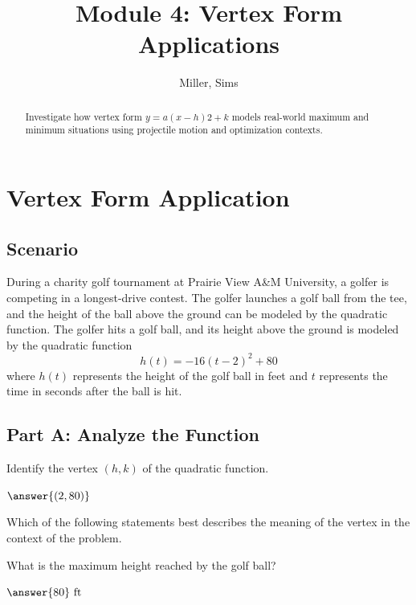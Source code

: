 \documentclass{ximera}
\title{Module 4: Vertex Form Applications}
\author{Miller, Sims}
\begin{document}
\begin{abstract}
    Investigate how vertex form $y=a(x-h)2 +k$ models real-world maximum and minimum situations using projectile motion and optimization contexts. 
\end{abstract}

\section{Vertex Form Application}

\subsection*{Scenario}
During a charity golf tournament at Prairie View A\&M University, a golfer is competing in a longest-drive contest. The golfer launches a golf ball from the tee, and the height of the ball above the ground can be modeled by the quadratic function. The golfer hits a golf ball, and its height above the ground is modeled by the quadratic function $$h(t)=-16(t-2)^2+80$$ where $h(t)$ represents the height of the golf ball in feet and $t$ represents the time in seconds after the ball is hit.


\subsection*{Part A: Analyze the Function}
\begin{problem}
Identify the vertex $(h,k)$ of the quadratic function. 

$\answer{(2,80)}$
\end{problem}

\begin{problem}
Which of the following statements best describes the meaning of the vertex in the context of the problem. 
\begin{multipleChoice}                     
         
                  \end{multipleChoice}    
\end{problem}

\begin{problem}
 What is the maximum height reached by the golf ball? 

 $\answer{80} \mbox{ ft}$
\end{problem}
\end{document}
